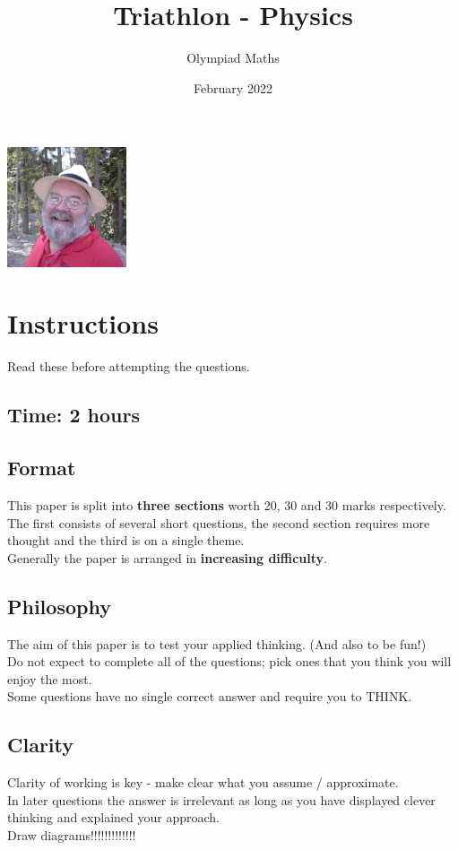 \documentclass{exam}
\title{Triathlon - Physics}
\author{Olympiad Maths}
\date{February 2022}
\begin{document}
\large
\maketitle

\begin{center}
    \vspace{-10pt}
    \includegraphics[height=100pt]{geoffsmith}
    \vspace{-10pt}
\end{center}

\section* {Instructions}

Read these before attempting the questions.

\subsection*{Time: 2 hours}

\subsection*{Format}
This paper is split into \textbf{three sections} worth 20, 30 and 30 marks respectively.\\
The first consists of several short questions, the second section requires more thought and the third is on a single theme.\\
Generally the paper is arranged in \textbf{increasing difficulty}.

\subsection*{Philosophy}
The aim of this paper is to test your applied thinking. (And also to be fun!)\\
Do not expect to complete all of the questions; pick ones that you think you will enjoy the most.\\
Some questions have no single correct answer and require you to THINK.

\subsection*{Clarity}
Clarity of working is key - make clear what you assume / approximate.\\
In later questions the answer is irrelevant as long as you have displayed clever thinking and explained your approach.\\
Draw diagrams!!!!!!!!!!!!!
\end{document}
